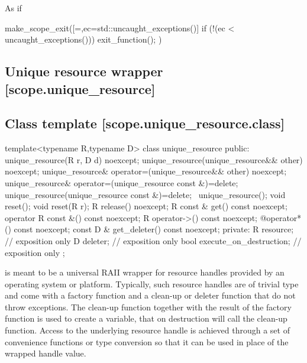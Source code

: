 \documentclass[ebook,11pt,article]{memoir}
\begin{document}
\begin{itemdescr}
\pnum
\returns As if
\begin{codeblock}
  make_scope_exit([=,ec=std::uncaught_exceptions()]
    {
      if (!(ec < uncaught_exceptions())) exit_function();
    })
\end{codeblock}

\end{itemdescr}




\subsection{Unique resource wrapper [scope.unique_resource]}

\subsection {Class template  [scope.unique_resource.class]}

\begin{codeblock}
template<typename R,typename D>
class unique_resource {
public:
  unique_resource(R r, D d) noexcept;
  unique_resource(unique_resource&& other) noexcept;
  unique_resource& operator=(unique_resource&& other) noexcept;
  unique_resource& operator=(unique_resource const &)=delete;
  unique_resource(unique_resource const &)=delete; 
  ~unique_resource();
  void reset();
  void reset(R r);
  R release() noexcept;
  R const & get() const noexcept;
  operator R const &() const noexcept;
  R operator->() const noexcept;
  @\seebelow@ operator*() const noexcept;
  const D & get_deleter() const noexcept;
private:
  R resource; // exposition only
  D deleter; // exposition only
  bool execute_on_destruction; // exposition only
};
\end{codeblock}

\pnum
\enternote
{} is meant to be a universal RAII wrapper for resource handles provided by an operating system or platform.
Typically, such resource handles are of trivial type and come with a factory function and a clean-up or deleter function that do not throw exceptions.
The clean-up function together with the result of the factory function is used to create a  variable, that on destruction will call the clean-up function. Access to the underlying resource handle is achieved through a set of convenience functions or type conversion so that it can be used in place of the wrapped handle value.
\exitnote
\end{document}
